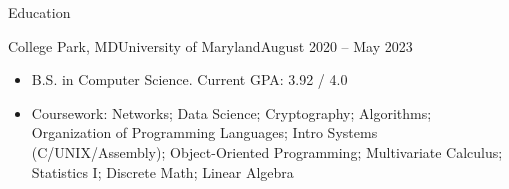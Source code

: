 \documentclass[]{mcdowellcv}
\begin{document}
	\makeheader
	
	\begin{cvsection}{Education}
		\begin{cvsubsection}{College Park, MD}{University of Maryland}{August 2020 -- May 2023}
			\begin{itemize}
				\item B.S. in Computer Science. Current GPA: 3.92 / 4.0
				\item Coursework: Networks; Data Science; Cryptography; Algorithms; Organization of Programming Languages; Intro
					  Systems (C/UNIX/Assembly); Object-Oriented Programming; Multivariate Calculus; Statistics I;
					  Discrete Math; Linear Algebra
			\end{itemize}
		\end{cvsubsection}
	\end{cvsection}
\end{document}

